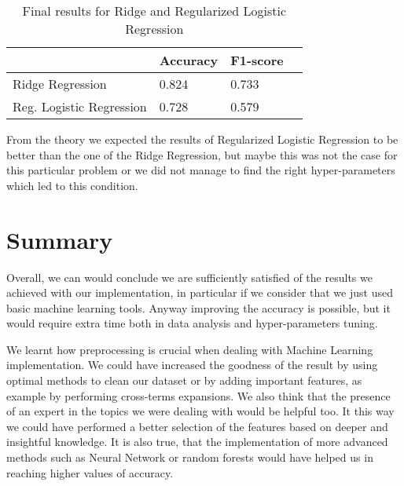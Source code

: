 \documentclass[10pt,article]{IEEEtran}
\begin{document}
\begin{table}[!h]
\centering
\label{tab:finalresults}
\begin{tabular}{l|l|l|l}
\cline{2-3}
                                                 & Accuracy & F1-score          \\ 
\hline
\multicolumn{1}{|l|}{Ridge Regression}                     & 0.824     & 0.733             \\ 
\cline{1-1}
\multicolumn{1}{|l|}{Reg. Logistic Regression}  & 0.728          & 0.579                 \\
\hline
\end{tabular}
\caption{Final results for Ridge and Regularized Logistic Regression }
\vspace{-0.5cm}
\end{table}

From the theory we expected the results of Regularized Logistic Regression to be better than the one of the Ridge Regression, but maybe this was not the case for this particular problem or we did not manage to find the right hyper-parameters which led to this condition.


\section{Summary}

Overall, we can would conclude we are sufficiently satisfied of the results we achieved with our implementation, in particular if we consider that we just used basic machine learning tools. Anyway improving the accuracy is possible, but it would require extra time both in data analysis and hyper-parameters tuning. 

We learnt how preprocessing is crucial when dealing with Machine Learning implementation. We could have increased the goodness of the result by using optimal methods to clean our dataset or by adding important features, as example by performing cross-terms expansions. We also think that the presence of an expert in the topics we were dealing with would be helpful too. It this way we could have performed a better selection of the features based on deeper and insightful knowledge. It is also true, that the implementation of more advanced methods such as Neural Network or random forests would have helped us in reaching higher values of accuracy.




\end{document}
